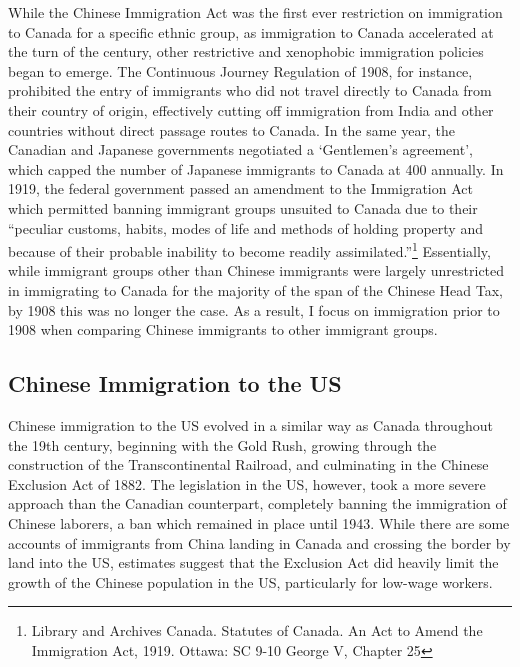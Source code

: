 While the Chinese Immigration Act was the first ever restriction on immigration to Canada for a specific ethnic group, as immigration to Canada accelerated at the turn of the century, other restrictive and xenophobic immigration policies began to emerge. The Continuous Journey Regulation of 1908, for instance, prohibited the entry of immigrants who did not travel directly to Canada from their country of origin, effectively cutting off immigration from India and other countries without direct passage routes to Canada. In the same year, the Canadian and Japanese governments negotiated a `Gentlemen's agreement', which capped the number of Japanese immigrants to Canada at 400 annually. 
In 1919, the federal government passed an amendment to the Immigration Act which permitted banning immigrant groups unsuited to Canada due to their “peculiar customs, habits, modes of life and methods of holding property and because of their probable inability to become readily assimilated.”\footnote{Library and Archives Canada. Statutes of Canada. An Act to Amend the Immigration Act, 1919. Ottawa: SC 9-10 George V, Chapter 25} Essentially, while immigrant groups other than Chinese immigrants were largely unrestricted in immigrating to Canada for the majority of the span of the Chinese Head Tax, by 1908 this was no longer the case. As a result, I focus on immigration prior to 1908 when comparing Chinese immigrants to other immigrant groups.


\subsection{Chinese Immigration to the US}
Chinese immigration to the US evolved in a similar way as Canada throughout the 19th century, beginning with the Gold Rush, growing through the construction of the Transcontinental Railroad, and culminating in the Chinese Exclusion Act of 1882.
The legislation in the US, however, took a more severe approach than the Canadian counterpart, completely banning the immigration of Chinese laborers, a ban which remained in place until 1943. 
While there are some accounts of immigrants from China landing in Canada and crossing the border by land into the US, estimates suggest that the Exclusion Act did heavily limit the growth of the Chinese population in the US, particularly for low-wage workers.